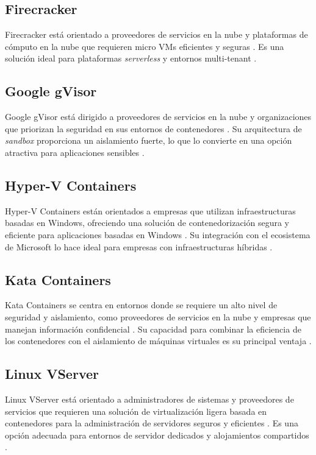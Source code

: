 \subsection{Firecracker}
\noindent
Firecracker está orientado a proveedores de servicios en la nube y plataformas de cómputo en la nube que requieren micro VMs eficientes y seguras \citep{Jain}. Es una solución ideal para plataformas \textit{serverless} y entornos multi-tenant \citep{246288}.

\subsection{Google gVisor}
\noindent
Google gVisor está dirigido a proveedores de servicios en la nube y organizaciones que priorizan la seguridad en sus entornos de contenedores \citep{LopezFalcon2024}. Su arquitectura de \textit{sandbox} proporciona un aislamiento fuerte, lo que lo convierte en una opción atractiva para aplicaciones sensibles \citep{gvisor2025}.

\subsection{Hyper-V Containers}
\noindent
Hyper-V Containers están orientados a empresas que utilizan infraestructuras basadas en Windows, ofreciendo una solución de contenedorización segura y eficiente para aplicaciones basadas en Windows \citep{Smith2016}. Su integración con el ecosistema de Microsoft lo hace ideal para empresas con infraestructuras híbridas \citep{Clark2024}.

\subsection{Kata Containers}
\noindent
Kata Containers se centra en entornos donde se requiere un alto nivel de seguridad y aislamiento, como proveedores de servicios en la nube y empresas que manejan información confidencial \citep{Viktorsson2020}. Su capacidad para combinar la eficiencia de los contenedores con el aislamiento de máquinas virtuales es su principal ventaja \citep{10.1145/1272996.1273025}.

\subsection{Linux VServer}
\noindent
Linux VServer está orientado a administradores de sistemas y proveedores de servicios que requieren una solución de virtualización ligera basada en contenedores para la administración de servidores seguros y eficientes \citep{10.1145/1272996.1273025}. Es una opción adecuada para entornos de servidor dedicados y alojamientos compartidos \citep{LinuxVirt2017}.

